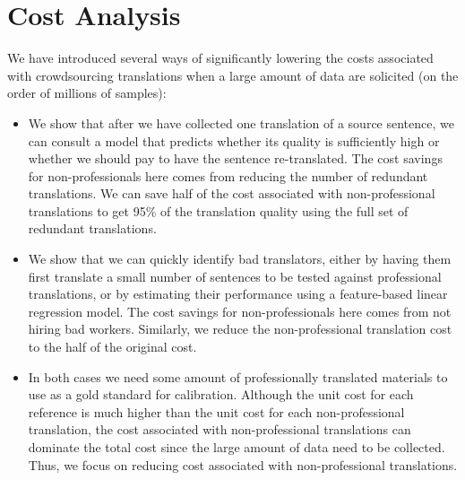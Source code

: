 \documentclass[11pt,letterpaper]{article}
\begin{document}
\section{Cost Analysis}

 We have introduced several ways of significantly lowering the costs associated with crowdsourcing translations when a large amount of data are solicited (on the order of millions of samples):
\begin{itemize}
\item We show that after we have collected one translation of a source sentence, we can consult a model that predicts whether its quality is sufficiently high or whether we should pay to have the sentence re-translated.  The cost savings for non-professionals here comes from reducing the number of redundant translations. We can save half of the cost associated with non-professional translations to get 95\% of the translation quality using the full set of redundant translations.
\item We show that we can quickly identify bad translators, either by having them first translate a small number of sentences to be tested against professional translations, or by estimating their performance using a feature-based linear regression model. The cost savings for non-professionals here comes from not hiring bad workers. Similarly, we reduce the non-professional translation cost to the half of the original cost.

\item In both cases we need some amount of professionally translated materials  to use as a gold standard for calibration. Although the unit cost for each reference is much higher than the unit cost for each non-professional translation, the cost associated with non-professional translations can dominate the total cost since the large amount of data need to be collected. Thus, we focus on reducing cost associated with non-professional translations. 
\end{itemize}
%
\end{document}
